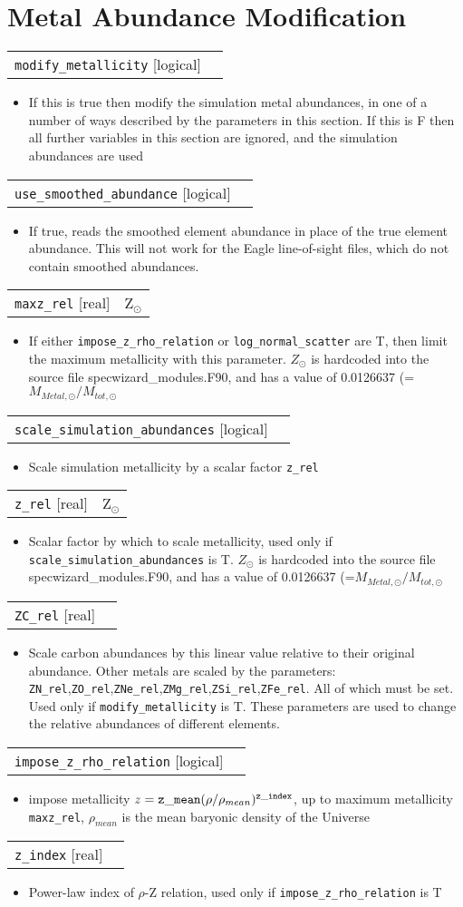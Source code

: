 \documentclass{report}
\makeatletter
\newcommand{\paramdefinition}[3]{
\begin{tabular*}{\textwidth}{l@{\extracolsep{\fill}}r}
		{\tt #1} [{\sc #2}]& #3 \\
\end{tabular*}}
\newcommand{\paramdescription}[1]{
\begin{itemize}
\item #1
\end{itemize}\vspace{0.2cm}}
\newcommand{\param}[1]{{\tt #1}}
\makeatother
\begin{document}
\section{Metal Abundance Modification}

\paramdefinition{modify\_metallicity}{logical}{ }
\paramdescription{If this is true then modify the simulation metal abundances, in one of a number of ways described by the parameters in this section.  If this is F then all further variables in this section are ignored, and the simulation abundances are used}

\paramdefinition{use\_smoothed\_abundance}{logical}{}
\paramdescription{If true, reads the smoothed element abundance in place of the true element abundance. This will not work for the Eagle line-of-sight files, which do not contain smoothed abundances.}

\paramdefinition{maxz\_rel}{real}{Z$_{\odot}$}
\paramdescription{If either {\tt impose\_z\_rho\_relation} or {\tt log\_normal\_scatter} are T, then limit the maximum metallicity with this parameter.  $Z_{\odot}$ is hardcoded into the source file specwizard\_modules.F90, and has a value of 0.0126637  (=$M_{Metal,\odot}/M_{tot,\odot}$}

\paramdefinition{scale\_simulation\_abundances}{logical}{ }
\paramdescription{Scale simulation metallicity by a scalar factor \param{z\_rel}}

\paramdefinition{z\_rel}{real}{Z$_{\odot}$}
\paramdescription{Scalar factor by which to scale metallicity, used only if {\tt scale\_simulation\_abundances} is T.   $Z_{\odot}$ is hardcoded into the source file specwizard\_modules.F90, and has a value of 0.0126637  (=$M_{Metal,\odot}/M_{tot,\odot}$}

\paramdefinition{ZC\_rel}{real}{}
\paramdescription{Scale carbon abundances by this linear value relative to their original abundance.  Other metals are scaled by the parameters: {\tt ZN\_rel},{\tt ZO\_rel},{\tt ZNe\_rel},{\tt ZMg\_rel},{\tt ZSi\_rel},{\tt ZFe\_rel}.  All of which must be set.  Used only if {\tt modify\_metallicity} is T.  These parameters are used to change the relative abundances of different elements.}

\paramdefinition{impose\_z\_rho\_relation}{logical}{ }
\paramdescription{ impose metallicity $z = {\tt z\_mean} (\rho/\rho_{mean})^{{\tt z\_index}}$, up to maximum metallicity {\tt maxz\_rel}, $\rho_{mean}$ is the mean baryonic density of the Universe}

\paramdefinition{z\_index}{real}{ }
\paramdescription{Power-law index of $\rho$-Z relation, used only if {\tt impose\_z\_rho\_relation} is T}
\end{document}
